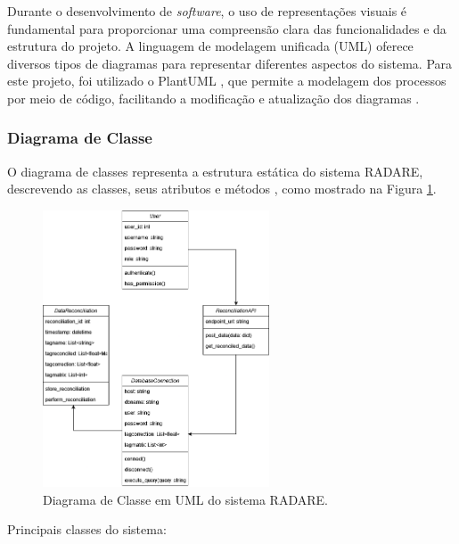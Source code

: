 Durante o desenvolvimento de \textit{software}, o uso de representações visuais é fundamental para proporcionar uma compreensão clara das funcionalidades e da estrutura do projeto. A linguagem de modelagem unificada (UML) oferece diversos tipos de diagramas para representar diferentes aspectos do sistema. Para este projeto, foi utilizado o PlantUML \cite{plantumldoc}, que permite a modelagem dos processos por meio de código, facilitando a modificação e atualização dos diagramas \cite{softwareengreq}.

\subsubsection{Diagrama de Classe}

O diagrama de classes representa a estrutura estática do sistema RADARE, descrevendo as classes, seus atributos e métodos \cite{softwareenguml}, como mostrado na Figura \ref{fig:ClassDiagram}.

\begin{figure}[htb]
    \caption{\label{fig:ClassDiagram}Diagrama de Classe em UML do sistema RADARE.}
    \begin{center}
        \includegraphics[width=0.6\textwidth]{figuras/ClassDiagramRADARE.drawio.png}
    \end{center}
\end{figure}

Principais classes do sistema:

